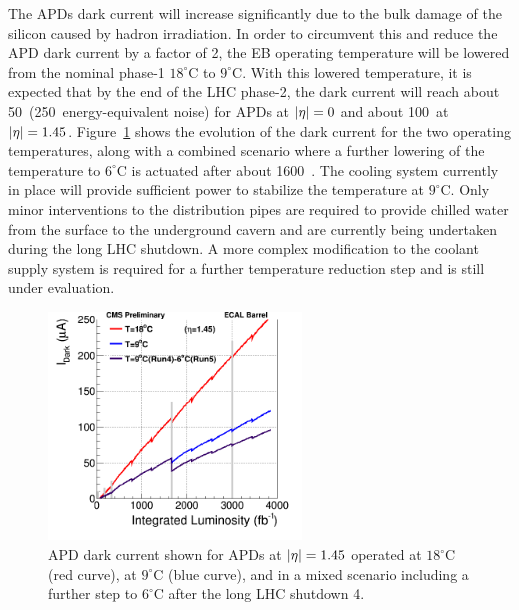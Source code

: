 The APDs dark current will increase significantly due to the bulk damage of the silicon caused by hadron irradiation. In order to circumvent this and reduce the APD dark current by a factor of 2, the EB operating temperature will be lowered from the nominal phase-1 $18^\circ \text{C}$ to $9^\circ \text{C}$. With this lowered temperature, it is expected that by the end of the LHC phase-2, the dark current will reach about 50~\mua (250~\MeV energy-equivalent noise) for APDs at $\lvert\eta\rvert = 0$ and about 100~\mua at $\lvert\eta\rvert = 1.45$. Figure~\ref{fig:APD} shows the evolution of the dark current for the two operating temperatures, along with a combined scenario where a further lowering of the temperature to $6^\circ \text{C}$ is actuated after about 1600~\fb. The cooling system currently in place will provide sufficient power to stabilize the temperature at $9^\circ \text{C}$. Only minor interventions to the distribution pipes are required to provide chilled water from the surface to the underground cavern and are currently being undertaken during the long LHC shutdown. A more complex modification to the coolant supply system is required for a further temperature reduction step and is still under evaluation.

\begin{figure}[htbp]
  \centering
  \includegraphics[width=0.6\textwidth]{plots/chapter3/APD.png}
  \caption{APD dark current shown for APDs at $\lvert\eta\rvert = 1.45$ operated at $18^\circ \text{C}$ (red curve), at $9^\circ \text{C}$ (blue curve), and in a mixed scenario including a further step to $6^\circ \text{C}$ after the long LHC shutdown 4.}
  \label{fig:APD}
\end{figure}

